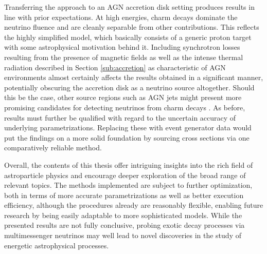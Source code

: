 \begin{spacing}{0.990}
	Transferring the approach to an AGN accretion disk setting produces results in line with prior expectations. At high energies,
	charm decays dominate the neutrino fluence and are cleanly separable from other contributions. This reflects the highly simplified
	model, which basically consists of a generic proton target with some astrophysical motivation behind it. Including synchrotron
	losses resulting from the presence of magnetic fields as well as the intense thermal radiation described in Section \ref{sub:accretion}
	as characteristic of AGN environments almost certainly affects the results obtained in a significant manner, potentially
	obscuring the accretion disk as a neutrino source altogether. Should this be the case, other source regions such as AGN jets
	might present more promising candidates for detecting neutrinos from charm decays \cite{Murase_2023}. As before, results must
	further be qualified with regard to the uncertain accuracy of underlying parametrizations. Replacing these with event generator
	data would put the findings on a more solid foundation by sourcing cross sections via one comparatively reliable method.
	\enlargethispage*{\baselineskip}\newpage
\end{spacing}

Overall, the contents of this thesis offer intriguing insights into the rich field of astroparticle physics and encourage deeper
exploration of the broad range of relevant topics. The methods implemented are subject to further optimization, both in terms
of more accurate parametrizations as well as better execution efficiency, although the procedures already are reasonably flexible,
enabling future research by being easily adaptable to more sophisticated models. While the presented results are not fully
conclusive, probing exotic decay processes via multimessenger neutrinos may well lead to novel discoveries in the study of
energetic astrophysical processes.
